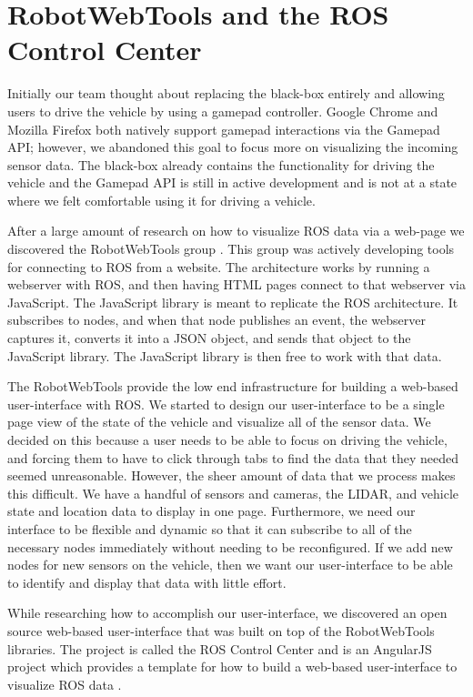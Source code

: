 \section{RobotWebTools and the ROS Control Center}Initially our team thought about replacing the black-box entirely and allowing users to drive the vehicle by using a gamepad controller.  Google Chrome and Mozilla Firefox both natively support gamepad interactions via the Gamepad API; however, we abandoned this goal to focus more on visualizing the incoming sensor data.  The black-box already contains the functionality for driving the vehicle and the Gamepad API is still in active development and is not at a state where we felt comfortable using it for driving a vehicle.

After a large amount of research on how to visualize ROS data via a web-page we discovered the RobotWebTools group \cite{robotwebtools}. This group was actively developing tools for connecting to ROS from a website.  The architecture works by running a webserver with ROS, and then having HTML pages connect to that webserver via JavaScript.  The JavaScript library is meant to replicate the ROS architecture.  It subscribes to nodes, and when that node publishes an event, the webserver captures it, converts it into a JSON object, and sends that object to the JavaScript library.  The JavaScript library is then free to work with that data.


The RobotWebTools provide the low end infrastructure for building a web-based user-interface with ROS.  We started to design our user-interface to be a single page view of the state of the vehicle and visualize all of the sensor data.  We decided on this because a user needs to be able to focus on driving the vehicle, and forcing them to have to click through tabs to find the data that they needed seemed unreasonable.  However, the sheer amount of data that we process makes this difficult.  We have a handful of sensors and cameras, the LIDAR, and vehicle state and location data to display in one page.  Furthermore, we need our interface to be flexible and dynamic so that it can subscribe to all of the necessary nodes immediately without needing to be reconfigured.  If we add new nodes for new sensors on the vehicle, then we want our user-interface to be able to identify and display that data with little effort.

While researching how to accomplish our user-interface, we discovered an open source web-based user-interface that was built on top of the RobotWebTools libraries.  The project is called the ROS Control Center and is an AngularJS project which provides a template for how to build a web-based user-interface to visualize ROS data \cite{roscontrolcenter}.

